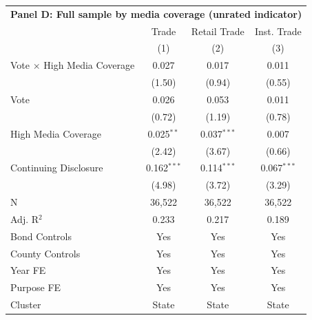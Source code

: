 \begingroup
\centering
\begin{tabular*}{\textwidth}{@{\extracolsep{\fill}}lccc}
\multicolumn{5}{l}{\textbf{Panel D: Full sample by media coverage (unrated indicator)}}\\

\addlinespace
   \toprule
                                      & Trade         & Retail Trade  & Inst. Trade\\  
                                      & (1)           & (2)           & (3)\\  
   \midrule 
   Vote $\times$ High Media Coverage  & 0.027         & 0.017         & 0.011\\   
                                      & (1.50)       & (0.94)       & (0.55)\\   
   Vote                               & 0.026         & 0.053         & 0.011\\   
                                      & (0.72)       & (1.19)       & (0.78)\\   
   High Media Coverage                & 0.025$^{**}$  & 0.037$^{***}$ & 0.007\\   
                                      & (2.42)       & (3.67)       & (0.66)\\   
   Continuing Disclosure              & 0.162$^{***}$ & 0.114$^{***}$ & 0.067$^{***}$\\   
                                      & (4.98)       & (3.72)       & (3.29)\\   
   \hline
   N                       & 36,522        & 36,522        & 36,522\\  
   Adj. R$^2$                     & 0.233         & 0.217         & 0.189\\  
   Bond Controls                      & Yes           & Yes           & Yes\\  
   County Controls                    & Yes           & Yes           & Yes\\  
   Year FE                            & Yes           & Yes           & Yes\\  
   Purpose FE                         & Yes           & Yes           & Yes\\  
   Cluster              & State & State & State\\  
   \bottomrule
\end{tabular*}
\par\endgroup

